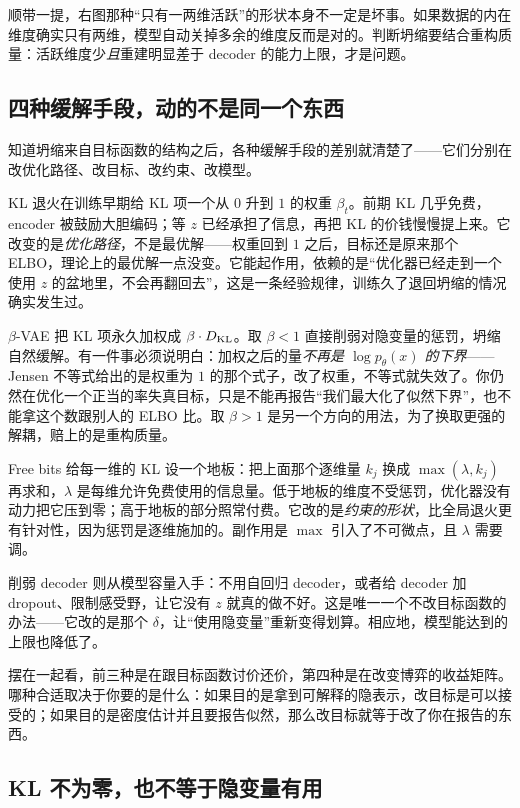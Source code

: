 顺带一提，右图那种``只有一两维活跃''的形状本身不一定是坏事。如果数据的内在维度确实只有两维，模型自动关掉多余的维度反而是对的。判断坍缩要结合重构质量：活跃维度少\emph{且}重建明显差于 decoder 的能力上限，才是问题。

\subsection{四种缓解手段，动的不是同一个东西}

知道坍缩来自目标函数的结构之后，各种缓解手段的差别就清楚了——它们分别在改优化路径、改目标、改约束、改模型。

KL 退火在训练早期给 KL 项一个从 \(0\) 升到 \(1\) 的权重 \(\beta_t\)。前期 KL 几乎免费，encoder 被鼓励大胆编码；等 \(z\) 已经承担了信息，再把 KL 的价钱慢慢提上来。它改变的是\emph{优化路径}，不是最优解——权重回到 \(1\) 之后，目标还是原来那个 ELBO，理论上的最优解一点没变。它能起作用，依赖的是``优化器已经走到一个使用 \(z\) 的盆地里，不会再翻回去''，这是一条经验规律，训练久了退回坍缩的情况确实发生过。

\(\beta\)-VAE 把 KL 项永久加权成 \(\beta\cdot D_{\mathrm{KL}}\)。取 \(\beta<1\) 直接削弱对隐变量的惩罚，坍缩自然缓解。有一件事必须说明白：加权之后的量\emph{不再是 \(\log p_\theta(x)\) 的下界}——Jensen 不等式给出的是权重为 \(1\) 的那个式子，改了权重，不等式就失效了。你仍然在优化一个正当的率失真目标，只是不能再报告``我们最大化了似然下界''，也不能拿这个数跟别人的 ELBO 比。取 \(\beta>1\) 是另一个方向的用法，为了换取更强的解耦，赔上的是重构质量。

Free bits 给每一维的 KL 设一个地板：把上面那个逐维量 \(k_j\) 换成 \(\max(\lambda, k_j)\) 再求和，\(\lambda\) 是每维允许免费使用的信息量。低于地板的维度不受惩罚，优化器没有动力把它压到零；高于地板的部分照常付费。它改的是\emph{约束的形状}，比全局退火更有针对性，因为惩罚是逐维施加的。副作用是 \(\max\) 引入了不可微点，且 \(\lambda\) 需要调。

削弱 decoder 则从模型容量入手：不用自回归 decoder，或者给 decoder 加 dropout、限制感受野，让它没有 \(z\) 就真的做不好。这是唯一一个不改目标函数的办法——它改的是那个 \(\delta\)，让``使用隐变量''重新变得划算。相应地，模型能达到的上限也降低了。

摆在一起看，前三种是在跟目标函数讨价还价，第四种是在改变博弈的收益矩阵。哪种合适取决于你要的是什么：如果目的是拿到可解释的隐表示，改目标是可以接受的；如果目的是密度估计并且要报告似然，那么改目标就等于改了你在报告的东西。

\subsection{KL 不为零，也不等于隐变量有用}

